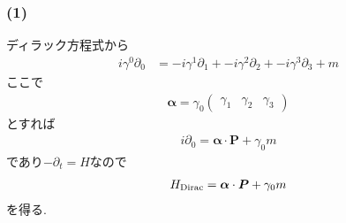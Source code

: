 \documentclass[uplatex,a4j,11pt,dvipdfmx]{jsarticle}
\begin{document}
\subsubsection*{(1)}
ディラック方程式から
\begin{align*}
  i\gamma^0\partial_0&=-i\gamma^1\partial_1+-i\gamma^2\partial_2+-i\gamma^3\partial_3+m
\end{align*}
ここで
\begin{align*}
  {\bm \alpha}=\gamma_0\left(
  \begin{array}{ccc}
    \gamma_1&\gamma_2&\gamma_3
  \end{array}
\right)
\end{align*}
とすれば
\begin{align*}
  i\partial_0={\bm \alpha}\cdot{\bm P}+\gamma_0 m
\end{align*}
であり$-\partial_t=H$なので
\begin{align}
  H_{\rm Dirac}={\bm \alpha}\cdot{\bm P}+\gamma_0 m
\end{align}
を得る.
\end{document}
